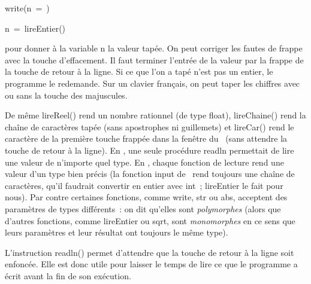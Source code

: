 \mbox{\blc  \blk\blk\idt  write({\cha {}n\ =\ })}\par
\mbox{\blc  \blk\blk\idt  n\ =\ lireEntier()}\par

\noindent pour donner à la variable {\idt n} la valeur tapée. On peut
corriger les fautes de frappe avec la touche  %
\framebox[11.mm][l]{$\leftarrow$~~~}\hspace{0.3ex}
d'effacement. Il faut terminer l'entrée de la valeur par la frappe de la touche %
\framebox[11.mm][l]{$\hookleftarrow$~~~}\hspace{0.3ex}
de retour à la ligne. Si ce que l'on a tapé n'est pas un entier, le programme le
redemande. Sur un clavier français, on peut taper les chiffres avec ou sans la touche
des majuscules.

De même {\idt lireReel()} rend un nombre rationnel (de type {\idt float}), {\idt lireChaine()}
rend la chaîne de caractères tapée (sans apostrophes ni guillemets) et {\idt lireCar()} rend
le caractère de la première touche frappée dans la fenêtre du \robot\ (sans attendre la touche de
retour à la ligne). En \pascal, une seule procédure {\idt readln} permettait de lire une valeur
de n'importe quel type. En \python, chaque fonction de lecture rend une valeur d'un type bien précis
(la fonction {\idt input} de \python\ rend toujours une chaîne de caractères, qu'il faudrait
convertir en entier avec {\idt int}~; {\idt lireEntier} le fait pour nous). Par contre certaines
fonctions, comme {\idt write}, {\idt str} ou {\idt abs}, acceptent des paramètres de types
différents~: on dit qu'elles sont {\em polymorphes} (alors que d'autres fonctions, comme
{\idt lireEntier} ou {\idt sqrt}, sont {\em monomorphes} en ce sens que leurs
paramètres et leur résultat ont toujours le même type).

L'instruction {\idt readln()} permet d'attendre que la touche %
\framebox[11.mm][l]{$\hookleftarrow$~~~}\hspace{0.3ex}
de retour à la ligne soit enfoncée. Elle est donc utile pour laisser le temps de lire ce que
le programme a écrit avant la fin de son exécution.

